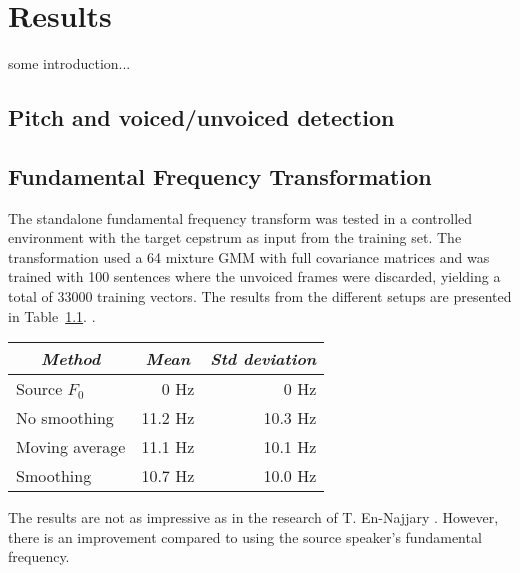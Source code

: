 \chapter{Results} %
\label{cha:results}

some introduction...

\section{Pitch and voiced/unvoiced detection} %
\label{sec:pitch_and_voiced_unvoiced_detection}






\section{Fundamental Frequency Transformation} %
\label{sec:fundamental_frequency_ransformation}
The standalone fundamental frequency transform was tested in a controlled environment with the target cepstrum as input from the training set. The transformation used a 64 mixture GMM with full covariance matrices and was trained with 100 sentences where the unvoiced frames were discarded, yielding a total of 33000 training vectors. The results from the different setups are presented in Table~\ref{tab:pitch_pred_target_input}. .
\begin{table}[htbp]
	\begin{center}
		\label{tab:pitch_pred_target_input}	
		\begin{tabular}{lrr}
			\toprule
			\multicolumn{1}{c}{\emph{Method}} & \multicolumn{1}{c}{\emph{Mean}} & \multicolumn{1}{c}{\emph{Std deviation}} \\
			\midrule
			Source $F_0$ & 0 Hz & 0 Hz \\
			No smoothing & 11.2 Hz & 10.3 Hz\\
			Moving average & 11.1 Hz & 10.1 Hz\\
			Smoothing & 10.7 Hz & 10.0 Hz \\
			\bottomrule			
		\end{tabular}		
	\end{center}
\end{table}
The results are not as impressive as in the research of T. En-Najjary \etal \cite{najjary03new}. However, there is an improvement compared to using the source speaker's fundamental frequency. 

